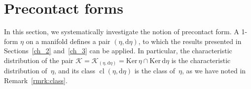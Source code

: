 \documentclass[11pt,twoside]{article}
\theoremstyle{plain}
\theoremstyle{definition}
\renewcommand{\d}{\mathrm{d}}
\DeclareMathOperator{\cl}{cl}
\def\d{\mathrm{d}}
\newcommand\dfn[1]{{\textbf{\emph{#1}}}}
\def\d{\mathrm{d}}
\def\Ker{\mathrm{Ker \,}}
\def\K{\mathcal{K}}
\begin{document}



\section{Precontact forms}
\label{sec_precontact}





In this section, 
we systematically investigate the notion of precontact form.
A 1-form $\eta$ on a manifold defines a pair 
$(\eta,\d\eta)$,
to which the results presented in Sections~\ref{ch_2} and~\ref{ch_3}
can be applied.
In particular,
the characteristic distribution of the pair
$\K = \K_{(\eta, \d\eta)} =
\Ker \eta \cap \Ker \d\eta$
is the characteristic distribution of~$\eta$,
and its class 
$\cl(\eta, \d \eta)$
is the class of~$\eta$,
as we have noted in Remark~\ref{rmrk:class}.



\end{document}
